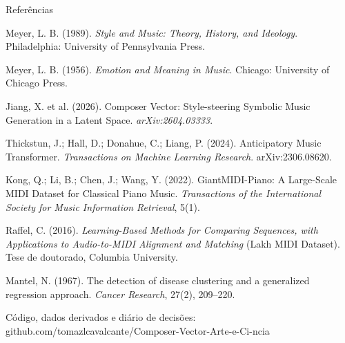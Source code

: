 \documentclass[aspectratio=169,10pt]{beamer}
\begin{document}
\begin{frame}{Referências}
  \vspace{0.3em}
  {\footnotesize\raggedright
  \setlength{\parskip}{0.45em}
  Meyer, L. B. (1989). \textit{Style and Music: Theory, History, and Ideology}. Philadelphia: University of Pennsylvania Press.\par
  Meyer, L. B. (1956). \textit{Emotion and Meaning in Music}. Chicago: University of Chicago Press.\par
  Jiang, X. et al. (2026). Composer Vector: Style-steering Symbolic Music Generation in a Latent Space. \textit{arXiv:2604.03333}.\par
  Thickstun, J.; Hall, D.; Donahue, C.; Liang, P. (2024). Anticipatory Music Transformer. \textit{Transactions on Machine Learning Research}. arXiv:2306.08620.\par
  Kong, Q.; Li, B.; Chen, J.; Wang, Y. (2022). GiantMIDI-Piano: A Large-Scale MIDI Dataset for Classical Piano Music. \textit{Transactions of the International Society for Music Information Retrieval}, 5(1).\par
  Raffel, C. (2016). \textit{Learning-Based Methods for Comparing Sequences, with Applications to Audio-to-MIDI Alignment and Matching} (Lakh MIDI Dataset). Tese de doutorado, Columbia University.\par
  Mantel, N. (1967). The detection of disease clustering and a generalized regression approach. \textit{Cancer Research}, 27(2), 209--220.\par
  \vspace{0.4em}
  {\color{cinza}Código, dados derivados e diário de decisões: github.com/tomazlcavalcante/Composer-Vector-Arte-e-Ci-ncia\par}
  }
\end{frame}
\end{document}
